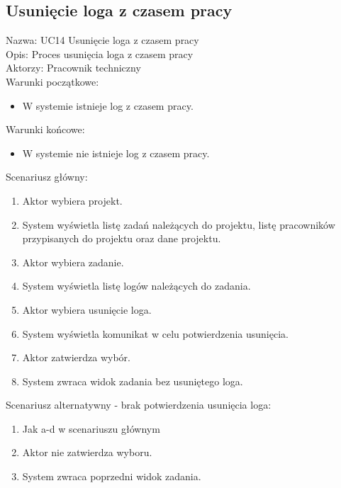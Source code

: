 \subsection{Usunięcie loga z czasem pracy}
\begin{adjustwidth}{5em}{0pt}
Nazwa: UC14 Usunięcie loga z czasem pracy \\
Opis: Proces usunięcia loga z czasem pracy \\
Aktorzy: Pracownik techniczny \\
Warunki początkowe:
\begin{itemize}
\item W systemie istnieje log z czasem pracy.
\end{itemize}
Warunki końcowe:
\begin{itemize}
\item W systemie nie istnieje log z czasem pracy.
\end{itemize}
Scenariusz główny:
\begin{enumerate}
\item Aktor wybiera projekt.
\item System wyświetla listę zadań należących do projektu, listę pracowników przypisanych do projektu oraz dane projektu.
\item Aktor wybiera zadanie.
\item System wyświetla listę logów należących do zadania.
\item Aktor wybiera usunięcie loga.
\item System wyświetla komunikat w celu potwierdzenia usunięcia.
\item Aktor zatwierdza wybór.
\item System zwraca widok zadania bez usuniętego loga.
\end{enumerate}
Scenariusz alternatywny - brak potwierdzenia usunięcia loga: 
\begin{enumerate}
\item Jak a-d w scenariuszu głównym
\item Aktor nie zatwierdza wyboru.
\item System zwraca poprzedni widok zadania.
\end{enumerate}
\end{adjustwidth}

